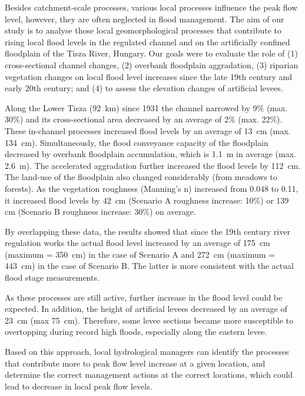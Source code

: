 {Besides catchment-scale processes, various local processes influence the peak flow level, however, they are often neglected in flood management. The aim of our study is to analyse those local geomorphological processes that contribute to rising local flood levels in the regulated channel and on the artificially confined floodplain of the Tisza River, Hungary. Our goals were to evaluate the role of (1) cross-sectional channel changes, (2) overbank floodplain aggradation, (3) riparian vegetation changes on local flood level increases since the late 19th century and early 20th century; and (4) to assess the elevation changes of artificial levees. 
	
Along the Lower Tisza (92~km) since 1931 the channel narrowed by 9\% (max. 30\%) and its cross-sectional area decreased by an average of 2\% (max. 22\%). These in-channel processes increased flood levels by an average of 13~cm (max. 134~cm). Simultaneously, the flood conveyance capacity of the floodplain decreased by overbank floodplain accumulation, which is 1.1~m in average (max. 2.6~m). The accelerated aggradation further increased the flood levels by 112~cm. The land-use of the floodplain also changed considerably (from meadows to forests). As the vegetation roughness (Manning’s n) increased from 0.048 to 0.11, it increased flood levels by 42~cm (Scenario A roughness increase: 10\%) or 139 cm (Scenario B roughness increase: 30\%) on average.

By overlapping these data, the results showed that since the 19th century river regulation works the actual flood level increased by an average of 175~cm (maximum = 350~cm) in the case of Scenario A and 272~cm (maximum = 443~cm) in the case of Scenario B. The latter is more consistent with the actual flood stage measurements. 

As these processes are still active, further increase in the flood level could be expected. In addition, the height of artificial levees decreased by an average of 23~cm (max 75~cm). Therefore, some levee sections became more susceptible to overtopping during record high floods, especially along the eastern levee. 

Based on this approach, local hydrological managers can identify the processes that contribute more to peak flow level increase at a given location, and determine the correct management actions at the correct locations, which could lead to decrease in local peak flow levels.
}
{
}

